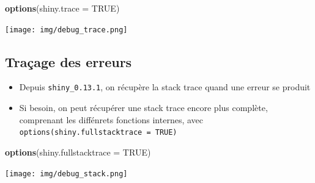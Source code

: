 \documentclass[
]{article}
\newenvironment{Shaded}{\begin{snugshade}}{\end{snugshade}}
\newcommand{\AttributeTok}[1]{\textcolor[rgb]{0.13,0.29,0.53}{#1}}
\newcommand{\ConstantTok}[1]{\textcolor[rgb]{0.56,0.35,0.01}{#1}}
\newcommand{\FunctionTok}[1]{\textcolor[rgb]{0.13,0.29,0.53}{\textbf{#1}}}
\newcommand{\NormalTok}[1]{#1}
\providecommand{\tightlist}{%
  \setlength{\itemsep}{0pt}\setlength{\parskip}{0pt}}
\begin{document}
\begin{Shaded}
\begin{Highlighting}[]
\FunctionTok{options}\NormalTok{(}\AttributeTok{shiny.trace =} \ConstantTok{TRUE}\NormalTok{) }
\end{Highlighting}
\end{Shaded}

\texttt{[image: img/debug\_trace.png]}

\hypertarget{trauxe7age-des-erreurs}{%
\subsection{Traçage des erreurs}\label{trauxe7age-des-erreurs}}

\begin{itemize}
\tightlist
\item
  Depuis \texttt{shiny\_0.13.1}, on récupère la stack trace quand une
  erreur se produit
\item
  Si besoin, on peut récupérer une stack trace encore plus complète,
  comprenant les diffénrets fonctions internes, avec
  \texttt{options(shiny.fullstacktrace\ =\ TRUE)}
\end{itemize}

\begin{Shaded}
\begin{Highlighting}[]
\FunctionTok{options}\NormalTok{(}\AttributeTok{shiny.fullstacktrace =} \ConstantTok{TRUE}\NormalTok{)}
\end{Highlighting}
\end{Shaded}

\texttt{[image: img/debug\_stack.png]}
\end{document}
